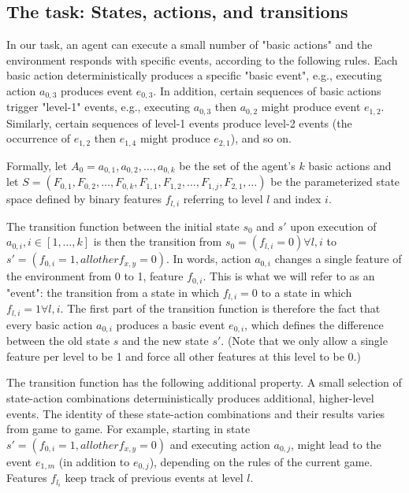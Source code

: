 \documentclass{article}
\begin{document}
\subsection{The task: States, actions, and transitions}

In our task, an agent can execute a small number of "basic actions" and the environment responds with specific events, according to the following rules. Each basic action deterministically produces a specific "basic event", e.g., executing action $a_{0, 3}$ produces event $e_{0, 3}$. In addition, certain sequences of basic actions trigger "level-1" events, e.g., executing $a_{0, 3}$ then $a_{0, 2}$ might produce event $e_{1, 2}$. Similarly, certain sequences of level-1 events produce level-2 events (the occurrence of $e_{1, 2}$ then $e_{1, 4}$ might produce $e_{2, 1}$), and so on.

Formally, let $A_0 = a_{0, 1}, a_{0, 2}, \ldots, a_{0, k}$ be the set of the agent's $k$ basic actions and let $S = (F_{0, 1}, F_{0, 2}, \ldots, F_{0, k}, F_{1, 1}, F_{1, 2}, \ldots, F_{1, j}, F_{2, 1}, \ldots)$ be the parameterized state space defined by binary features $f_{l, i}$ referring to level $l$ and index $i$.

The transition function between the initial state $s_0$ and $s'$ upon execution of $a_{0, i}, i \in [1, \ldots, k]$ is then the transition from $s_0 = (f_{l, i} = 0) \forall l, i$ to $s' = (f_{0, i} = 1, all other f_{x, y} = 0)$. In words, action $a_{0, i}$ changes a single feature of the environment from 0 to 1, feature $f_{0, i}$. This is what we will refer to as an "event": the transition from a state in which $f_{l, i} = 0$ to a state in which $f_{l, i} = 1 \forall l, i$. The first part of the transition function is therefore the fact that every basic action $a_{0, i}$ produces a basic event $e_{0, i}$, which defines the difference between the old state $s$ and the new state $s'$. (Note that we only allow a single feature per level to be 1 and force all other features at this level to be 0.)

The transition function has the following additional property. A small selection of state-action combinations deterministically produces additional, higher-level events. The identity of these state-action combinations and their results varies from game to game. For example, starting in state $s' = (f_{0, i} = 1, all other f_{x, y} = 0)$ and executing action $a_{0, j}$, might lead to the event $e_{1, m}$ (in addition to $e_{0, j}$), depending on the rules of the current game. Features $f_{l_i}$ keep track of previous events at level $l$.
\end{document}
